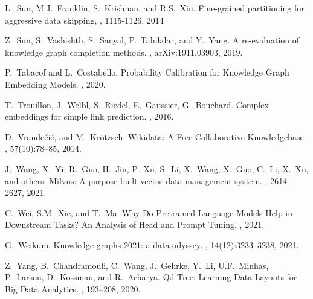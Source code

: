 \documentclass[11pt]{article}
\begin{document}
\begin{thebibliography}{10}
\begin{small}
 L.~Sun, M.J.~Franklin, S.~Krishnan, and R.S.~Xin. \newblock Fine-grained partitioning for aggressive data skipping, , 1115-1126, 2014

 Z.~Sun, S.~Vashishth, S.~Sanyal, P.~Talukdar, and Y.~Yang. \newblock A re-evaluation of knowledge graph completion methods. , arXiv:1911.03903, 2019.

 P.~Tabacof and L.~Costabello. \newblock Probability Calibration for Knowledge Graph Embedding Models. , 2020.

 T.~Trouillon, J.~Welbl, S.~Riedel, E.~Gaussier, G.~Bouchard. \newblock Complex embeddings for simple link prediction. , 2016.


 D.~Vrande\v{c}i\'{c}, and M.~Kr\"{o}tzsch. \newblock Wikidata: A Free Collaborative Knowledgebase. , 57(10):78--85, 2014.

  J.~Wang, X.~Yi, R.~Guo, H.~Jin, P.~Xu, S.~Li, X.~Wang, X.~Guo, C.~Li, X.~Xu, and others. \newblock Milvus: A purpose-built vector data management system. , 2614--2627, 2021.

 C.~Wei, S.M.~Xie, and T.~Ma. \newblock Why Do Pretrained Language Models Help in Downstream Tasks? An Analysis of Head and Prompt Tuning. , 2021.

 G.~Weikum. \newblock Knowledge graphs 2021: a data odyssey. , 14(12):3233--3238, 2021.

 Z.~Yang, B.~Chandramouli, C.~Wang, J.~Gehrke, Y.~Li, U.F.~Minhas, P.~Larson, D.~Kossman, and R.~Acharya. \newblock Qd-Tree: Learning Data Layouts for Big Data Analytics. , 193--208, 2020.



\end{small}
\end{thebibliography}
\end{document}
